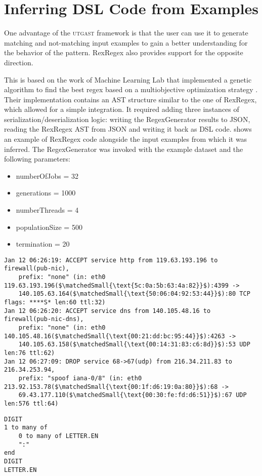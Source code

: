 \section{Inferring DSL Code from Examples} \label{sec:inferenceOfRexRegex}

One advantage of the \textsc{utgast} framework is that the user can use it to generate matching and not-matching input examples to gain a better understanding for the behavior of the pattern. RexRegex also provides support for the opposite direction.

This is based on the work of Machine Learning Lab that implemented a genetic algorithm to find the best regex based on a multiobjective optimization strategy \cite{bartoli2016inference}\cite{bartoli2016can}\cite{bartoli2015evolutionary}. Their implementation contains an AST structure similar to the one of RexRegex, which allowed for a simple integration. It required adding three instances of serialization/deserialization logic: writing the RegexGenerator results to JSON, reading the RexRegex AST from JSON and writing it back as DSL code.
 shows an example of RexRegex code alongside the input examples from which it was inferred. The RegexGenerator was invoked with the example dataset and the following parameters:

\begin{itemize}
    \setlength\itemsep{0em}
    \item numberOfJobs = 32
    \item generations = 1000
    \item numberThreads = 4
    \item populationSize = 500
    \item termination = 20
\end{itemize}

\FloatBarrier

\begin{listingBox}[float=htb,title={Infered RexRegex Code from Examples},label=code:inferenceOfRexRegex]
    \begin{lstlisting}[basicstyle=\scriptsize,mathescape=true]
Jan 12 06:26:19: ACCEPT service http from 119.63.193.196 to firewall(pub-nic), 
    prefix: "none" (in: eth0 119.63.193.196($\matchedSmall{\text{5c:0a:5b:63:4a:82}}$):4399 -> 
    140.105.63.164($\matchedSmall{\text{50:06:04:92:53:44}}$):80 TCP flags: ****S* len:60 ttl:32)
Jan 12 06:26:20: ACCEPT service dns from 140.105.48.16 to firewall(pub-nic-dns), 
    prefix: "none" (in: eth0 140.105.48.16($\matchedSmall{\text{00:21:dd:bc:95:44}}$):4263 -> 
    140.105.63.158($\matchedSmall{\text{00:14:31:83:c6:8d}}$):53 UDP len:76 ttl:62)
Jan 12 06:27:09: DROP service 68->67(udp) from 216.34.211.83 to 216.34.253.94, 
    prefix: "spoof iana-0/8" (in: eth0 213.92.153.78($\matchedSmall{\text{00:1f:d6:19:0a:80}}$):68 -> 
    69.43.177.110($\matchedSmall{\text{00:30:fe:fd:d6:51}}$):67 UDP len:576 ttl:64)
    \end{lstlisting}
    \tcblower
    \begin{lstlisting}[style=rexregex]
DIGIT
1 to many of
    0 to many of LETTER.EN
    ":"
end
DIGIT
LETTER.EN
    \end{lstlisting}
\end{listingBox}

